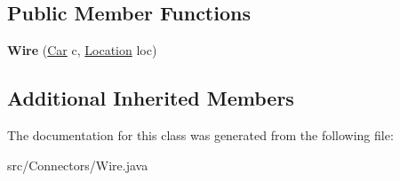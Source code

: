 \subsection*{Public Member Functions}
\begin{DoxyCompactItemize}
\item 
\hypertarget{classConnectors_1_1Wire_aa76cc89eba376942be5f71fc3d068f09}{}{\bfseries Wire} (\hyperlink{classCars_1_1Car}{Car} c, \hyperlink{enumEnums_1_1Location}{Location} loc)\label{classConnectors_1_1Wire_aa76cc89eba376942be5f71fc3d068f09}

\end{DoxyCompactItemize}
\subsection*{Additional Inherited Members}


The documentation for this class was generated from the following file\+:\begin{DoxyCompactItemize}
\item 
src/\+Connectors/Wire.\+java\end{DoxyCompactItemize}
